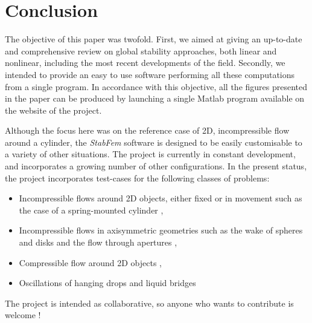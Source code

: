 \documentclass[twocolumn,10pt]{asme2ej}
\begin{document}

\section{Conclusion}


The objective of this paper was twofold. First, we aimed at giving an up-to-date and comprehensive review on global stability approaches, both linear and nonlinear, including the most recent developments of the field. 
Secondly, we intended to provide an easy to use software performing all these computations from a single program. In accordance with this objective, all the figures presented in the paper can be produced by launching a single Matlab program available on the website of the project.

Although the focus here was on the reference case of 2D, incompressible flow around a cylinder, the  {\em StabFem } software is designed to be easily customisable to a variety of other situations. The project is currently in constant development, and incorporates a growing number of other configurations. In the present status, the project incorporates test-cases for the following classes of problems:
\begin{itemize}
\item Incompressible flows around 2D objects, either fixed or in movement such as the case of a spring-mounted cylinder \cite{Navrose},
\item Incompressible flows in axisymmetric geometries such as the wake of spheres and disks \cite{Tchoufag16} and the flow through apertures \cite{FabreASME}, 
\item Compressible flow around 2D objects  \cite{Fani18}, 
\item Oscillations of hanging drops and liquid bridges \cite{Chireux}
\end{itemize}
The project is intended as collaborative, so anyone who wants to contribute is welcome !





\end{document}
